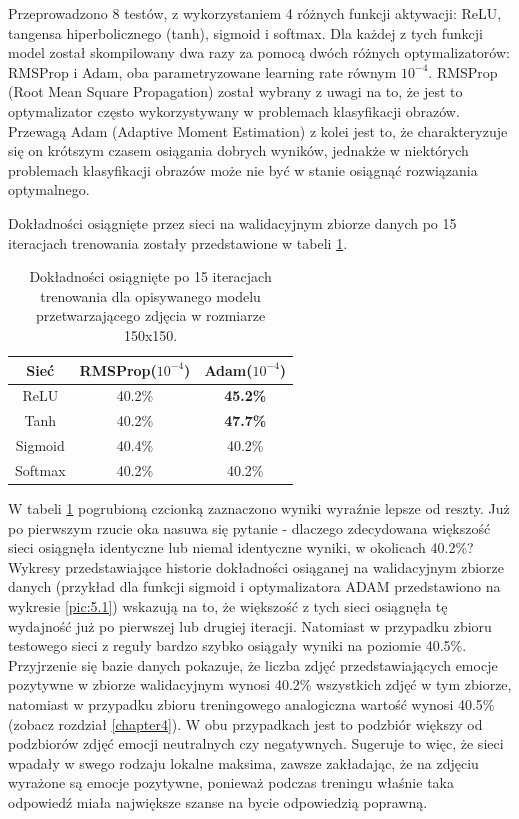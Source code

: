 Przeprowadzono 8 testów, z wykorzystaniem 4 różnych funkcji aktywacji: ReLU, tangensa hiperbolicznego (tanh), sigmoid i softmax. Dla każdej z tych funkcji model został skompilowany dwa razy za pomocą dwóch różnych optymalizatorów: RMSProp i Adam, oba parametryzowane learning rate równym $10^{-4}$. RMSProp (Root Mean Square Propagation) został wybrany z uwagi na to, że jest to optymalizator często wykorzystywany w problemach klasyfikacji obrazów. Przewagą Adam (Adaptive Moment Estimation) z kolei jest to, że charakteryzuje się on krótszym czasem osiągania dobrych wyników, jednakże w niektórych problemach klasyfikacji obrazów może nie być w stanie osiągnąć rozwiązania optymalnego.

Dokładności osiągnięte przez sieci na walidacyjnym zbiorze danych po 15 iteracjach trenowania zostały przedstawione w tabeli \ref{tab:5.1}.

\begin{table}[H]
  \caption{Dokładności osiągnięte po 15 iteracjach trenowania dla opisywanego modelu przetwarzającego zdjęcia w rozmiarze 150x150.}
    \centering
    \begin{tabular}{ |c|c|c| }
    \hline
    Sieć & RMSProp($10^{-4}$) & Adam($10^{-4}$) \\
    \hline
    ReLU & 40.2\% & \textbf{45.2\%} \\
    Tanh & 40.2\% & \textbf{47.7\%} \\
    Sigmoid & 40.4\% & 40.2\% \\
    Softmax & 40.2\% & 40.2\% \\
    \hline
    \end{tabular}
  \label{tab:5.1}
\end{table}

W tabeli \ref{tab:5.1} pogrubioną czcionką zaznaczono wyniki wyraźnie lepsze od reszty. Już po pierwszym rzucie oka nasuwa się pytanie - dlaczego zdecydowana większość sieci osiągnęła identyczne lub niemal identyczne wyniki, w okolicach 40.2\%? Wykresy przedstawiające historie dokładności osiąganej na walidacyjnym zbiorze danych (przykład dla funkcji sigmoid i optymalizatora ADAM przedstawiono na wykresie \ref{pic:5.1}) wskazują na to, że większość z tych sieci osiągnęła tę wydajność już po pierwszej lub drugiej iteracji. Natomiast w przypadku zbioru testowego sieci z reguły bardzo szybko osiągały wyniki na poziomie 40.5\%. Przyjrzenie się bazie danych pokazuje, że liczba zdjęć przedstawiających emocje pozytywne w zbiorze walidacyjnym wynosi 40.2\% wszystkich zdjęć w tym zbiorze, natomiast w przypadku zbioru treningowego analogiczna wartość wynosi 40.5\% (zobacz rozdział \ref{chapter4}). W obu przypadkach jest to podzbiór większy od podzbiorów zdjęć emocji neutralnych czy negatywnych. Sugeruje to więc, że sieci wpadały w swego rodzaju lokalne maksima, zawsze zakładając, że na zdjęciu wyrażone są emocje pozytywne, ponieważ podczas treningu właśnie taka odpowiedź miała największe szanse na bycie odpowiedzią poprawną.

